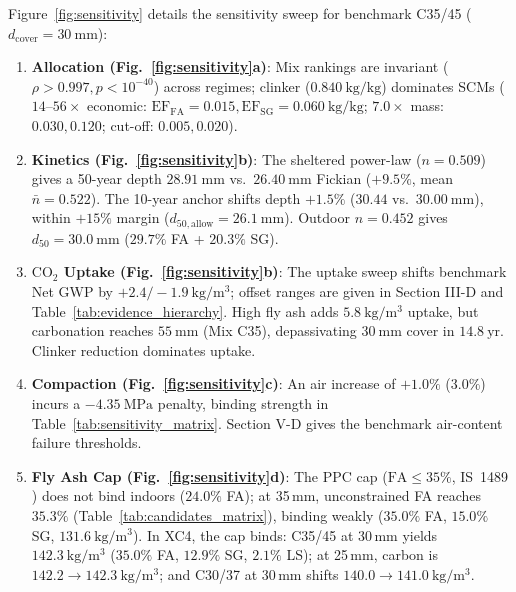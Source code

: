 \documentclass[journal]{IEEEtran}
\begin{document}
Figure~\ref{fig:sensitivity} details the sensitivity sweep for benchmark C35/45 ($d_{\mathrm{cover}} = 30\ \mathrm{mm}$):
\begin{enumerate}\setlength{\itemsep}{0pt}\setlength{\parskip}{0pt}
    \item \textbf{Allocation (Fig.~\ref{fig:sensitivity}a)}: Mix rankings are invariant ($\rho > 0.997, p < 10^{-40}$) across regimes; clinker ($0.840\ \mathrm{kg/kg}$) dominates SCMs ($14\text{--}56\times$ economic: $\mathrm{EF}_{\mathrm{FA}} = 0.015, \mathrm{EF}_{\mathrm{SG}} = 0.060\ \mathrm{kg/kg}$; $7.0\times$ mass: $0.030, 0.120$; cut-off: $0.005, 0.020$).
    \item \textbf{Kinetics (Fig.~\ref{fig:sensitivity}b)}: The sheltered power-law ($n = 0.509$) gives a 50-year depth $28.91\ \mathrm{mm}$ vs.\ $26.40\ \mathrm{mm}$ Fickian ($+9.5\%$, mean $\bar{n} = 0.522$). The 10-year anchor shifts depth $+1.5\%$ ($30.44$ vs.\ $30.00\ \mathrm{mm}$), within $+15\%$ margin ($d_{50,\mathrm{allow}} = 26.1\ \mathrm{mm}$). Outdoor $n = 0.452$ gives $d_{50} = 30.0\ \mathrm{mm}$ ($29.7\%$ FA + $20.3\%$ SG).
    \item \textbf{$\mathrm{CO}_2$ Uptake (Fig.~\ref{fig:sensitivity}b)}: The uptake sweep shifts benchmark Net GWP by $+2.4 / -1.9\ \mathrm{kg/m^3}$; offset ranges are given in Section III-D and Table~\ref{tab:evidence_hierarchy}. High fly ash adds $5.8\ \mathrm{kg/m^3}$ uptake, but carbonation reaches $55\ \mathrm{mm}$ (Mix C35), depassivating $30\ \mathrm{mm}$ cover in $14.8\ \mathrm{yr}$. Clinker reduction dominates uptake.
    \item \textbf{Compaction (Fig.~\ref{fig:sensitivity}c)}: An air increase of $+1.0\%$ ($3.0\%$) incurs a $-4.35\ \mathrm{MPa}$ penalty, binding strength in Table~\ref{tab:sensitivity_matrix}. Section V-D gives the benchmark air-content failure thresholds.
    \item \textbf{Fly Ash Cap (Fig.~\ref{fig:sensitivity}d)}: The PPC cap ($\mathrm{FA} \le 35\%$, IS~1489 \cite{is1489}) does not bind indoors ($24.0\%$ FA); at 35\,mm, unconstrained FA reaches $35.3\%$ (Table~\ref{tab:candidates_matrix}), binding weakly ($35.0\%$ FA, $15.0\%$ SG, $131.6\ \mathrm{kg/m^3}$). In XC4, the cap binds: C35/45 at 30\,mm yields $142.3\ \mathrm{kg/m^3}$ ($35.0\%$ FA, $12.9\%$ SG, $2.1\%$ LS); at 25\,mm, carbon is $142.2 \to 142.3\ \mathrm{kg/m^3}$; and C30/37 at 30\,mm shifts $140.0 \to 141.0\ \mathrm{kg/m^3}$.
\end{enumerate}
\end{document}
